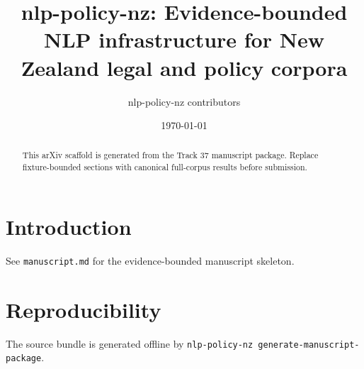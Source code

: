 \documentclass[11pt]{article}
\title{nlp-policy-nz: Evidence-bounded NLP infrastructure for New Zealand legal and policy corpora}
\author{nlp-policy-nz contributors}
\date{\today}
\begin{document}
\maketitle
\begin{abstract}
This arXiv scaffold is generated from the Track 37 manuscript package. Replace fixture-bounded sections with canonical full-corpus results before submission.
\end{abstract}
\section{Introduction}
See \texttt{manuscript.md} for the evidence-bounded manuscript skeleton.
\section{Reproducibility}
The source bundle is generated offline by \texttt{nlp-policy-nz generate-manuscript-package}.


\end{document}
